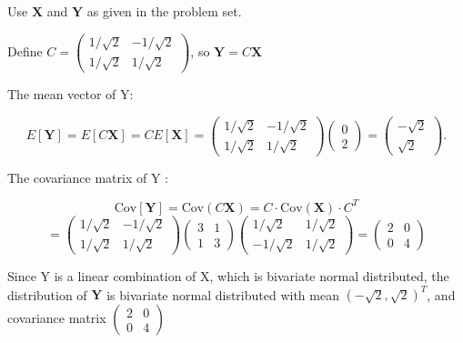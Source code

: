 Use $\textbf{X}$ and $\textbf{Y}$ as given in the problem set.


Define $C =  \begin{pmatrix}
1/ \sqrt{2} & - 1/ \sqrt{2} \\
1/ \sqrt{2}  & 1/ \sqrt{2} 
\end{pmatrix}$, so $\textbf{Y} = C\textbf{X}$

The mean vector of Y:

$$E[\textbf{Y}] = E[C \textbf{X}] = C E[\textbf{X}] = \begin{pmatrix}
1/ \sqrt{2} & - 1/ \sqrt{2} \\
1/ \sqrt{2}  & 1/ \sqrt{2} 
\end{pmatrix} \begin{pmatrix}
0 \\
2  
\end{pmatrix} = \begin{pmatrix}
- \sqrt{2}\\
\sqrt{2}  
\end{pmatrix} .$$


The covariance matrix of Y : 

$$\text{Cov}[\textbf{Y}] = \text{Cov}(C\textbf{X}) = C \cdot \text{Cov}(\textbf{X}) \cdot C^T $$ $$= \begin{pmatrix}
1/ \sqrt{2} & - 1/ \sqrt{2} \\
1/ \sqrt{2}  & 1/ \sqrt{2} 
\end{pmatrix} \begin{pmatrix}
3 & 1 \\
1  & 3
\end{pmatrix} \begin{pmatrix}
1/ \sqrt{2} &  1/ \sqrt{2} \\
- 1/ \sqrt{2}  & 1/ \sqrt{2} 
\end{pmatrix} = \begin{pmatrix}
2 & 0\\
0  & 4 
\end{pmatrix} $$


Since Y is a linear combination of X, which is bivariate normal distributed, the distribution of $\textbf{Y}$ is bivariate normal distributed with mean $(-\sqrt{2}, \sqrt{2})^T$, and covariance matrix $\begin{pmatrix}
2 & 0\\
0  & 4 
\end{pmatrix} $

